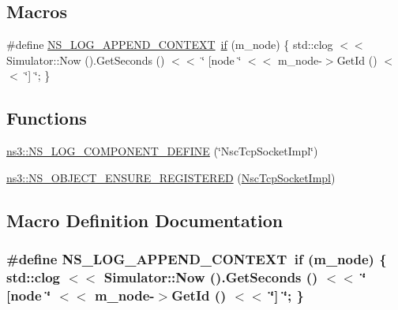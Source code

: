 \subsection*{Macros}
\begin{DoxyCompactItemize}
\item 
\#define \hyperlink{nsc-tcp-socket-impl_8cc_abe50035652d407c40bdaef78214c4955}{N\+S\+\_\+\+L\+O\+G\+\_\+\+A\+P\+P\+E\+N\+D\+\_\+\+C\+O\+N\+T\+E\+XT}~\hyperlink{loss__OH__large__cities__urban_8m_ac77b6cfa3068152087725fe54b4ae8c8}{if} (m\+\_\+node) \{ std\+::clog $<$$<$ Simulator\+::\+Now ().Get\+Seconds () $<$$<$ \char`\"{} \mbox{[}node \char`\"{} $<$$<$ m\+\_\+node-\/$>$Get\+Id () $<$$<$ \char`\"{}\mbox{]} \char`\"{}; \}
\end{DoxyCompactItemize}
\subsection*{Functions}
\begin{DoxyCompactItemize}
\item 
\hyperlink{namespacens3_a654e86c2a7f75cc9ded91e4164572afe}{ns3\+::\+N\+S\+\_\+\+L\+O\+G\+\_\+\+C\+O\+M\+P\+O\+N\+E\+N\+T\+\_\+\+D\+E\+F\+I\+NE} (\char`\"{}Nsc\+Tcp\+Socket\+Impl\char`\"{})
\item 
\hyperlink{namespacens3_ac19af2855e0c17d4e31e8ff9d36f5caf}{ns3\+::\+N\+S\+\_\+\+O\+B\+J\+E\+C\+T\+\_\+\+E\+N\+S\+U\+R\+E\+\_\+\+R\+E\+G\+I\+S\+T\+E\+R\+ED} (\hyperlink{classns3_1_1NscTcpL4Protocol_ae004dd5b6155dc0a19b62d246b3b015e}{Nsc\+Tcp\+Socket\+Impl})
\end{DoxyCompactItemize}


\subsection{Macro Definition Documentation}
\subsubsection[{\texorpdfstring{N\+S\+\_\+\+L\+O\+G\+\_\+\+A\+P\+P\+E\+N\+D\+\_\+\+C\+O\+N\+T\+E\+XT}{NS_LOG_APPEND_CONTEXT}}]{\setlength{\rightskip}{0pt plus 5cm}\#define N\+S\+\_\+\+L\+O\+G\+\_\+\+A\+P\+P\+E\+N\+D\+\_\+\+C\+O\+N\+T\+E\+XT~{\bf if} (m\+\_\+node) \{ std\+::clog $<$$<$ Simulator\+::\+Now ().Get\+Seconds () $<$$<$ \char`\"{} \mbox{[}node \char`\"{} $<$$<$ m\+\_\+node-\/$>$Get\+Id () $<$$<$ \char`\"{}\mbox{]} \char`\"{}; \}}\hypertarget{nsc-tcp-socket-impl_8cc_abe50035652d407c40bdaef78214c4955}{}\label{nsc-tcp-socket-impl_8cc_abe50035652d407c40bdaef78214c4955}
